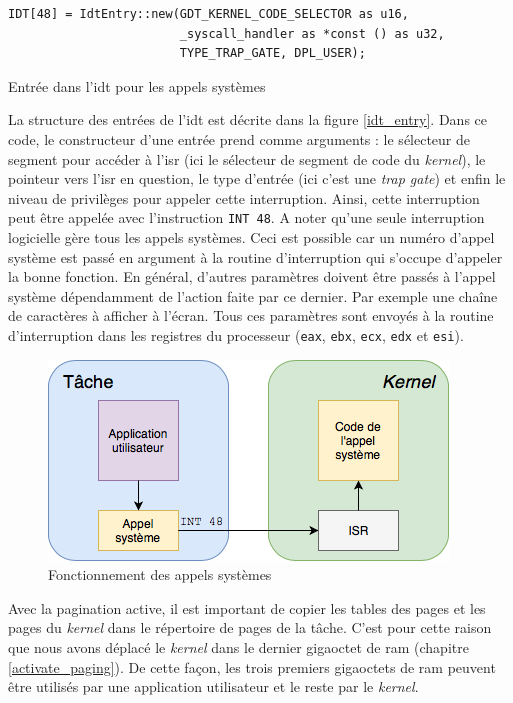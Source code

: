 \begin{code}
\begin{verbatim}
IDT[48] = IdtEntry::new(GDT_KERNEL_CODE_SELECTOR as u16,
                        _syscall_handler as *const () as u32,
                        TYPE_TRAP_GATE, DPL_USER);
\end{verbatim}
\caption{Entrée dans l'\acrshort{idt} pour les appels systèmes}
\label{lst:tasks:syscalls:idtentry}
\end{code} \medbreak

La structure des entrées de l'\acrshort{idt} est décrite dans la figure \ref{idt_entry}.
Dans ce code, le constructeur d'une entrée prend comme arguments : le sélecteur de
segment pour accéder à l'\acrshort{isr} (ici le sélecteur de segment de code du
\textit{kernel}), le pointeur vers l'\acrshort{isr} en question, le type d'entrée
(ici c'est une \textit{trap gate}) et enfin le niveau de privilèges pour appeler
cette interruption. Ainsi, cette interruption peut être appelée avec l'instruction
\texttt{INT 48}. A noter qu'une seule interruption logicielle gère tous
les appels systèmes. Ceci est possible car un numéro d'appel système est passé en
argument à la routine d'interruption qui s'occupe d'appeler la bonne fonction.
En général, d'autres paramètres doivent être passés à l'appel système dépendamment
de l'action faite par ce dernier. Par exemple une chaîne de caractères à afficher
à l'écran. Tous ces paramètres sont envoyés à la routine d'interruption dans les
registres du processeur (\texttt{eax}, \texttt{ebx}, \texttt{ecx},
\texttt{edx} et \texttt{esi}).

\begin{figure}[!h]
  \centering
  \includegraphics[scale=.7]{images/syscall.png}
  \caption{Fonctionnement des appels systèmes}
  \label{syscall}
\end{figure}

Avec la pagination active, il est important de copier les tables des pages et les
pages du \textit{kernel} dans le répertoire de pages de la tâche. C'est pour cette
raison que nous avons déplacé le \textit{kernel} dans le dernier gigaoctet de
\acrshort{ram} (chapitre \ref{activate_paging}). De cette façon, les trois premiers
gigaoctets de \acrshort{ram} peuvent être utilisés par une application utilisateur
et le reste par le \textit{kernel}.

